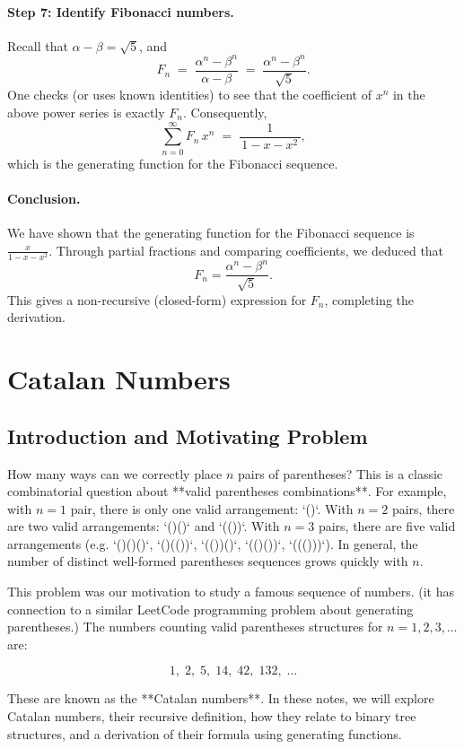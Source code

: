 \documentclass{article}
\begin{document}
\paragraph{Step 7: Identify Fibonacci numbers.}

Recall that \(\alpha - \beta = \sqrt{5}\), and
\[
F_n
\;=\;
\frac{\alpha^n - \beta^n}{\,\alpha - \beta\,}
\;=\;
\frac{\alpha^n - \beta^n}{\,\sqrt{5}\,}.
\]
One checks (or uses known identities) to see that the coefficient of \(x^n\) in the above power series is exactly \(F_n\).  Consequently,
\[
\sum_{n=0}^\infty F_n \, x^n
\;=\;
\frac{1}{\,1 - x - x^2\,},
\]
which is the generating function for the Fibonacci sequence.

\paragraph{Conclusion.}
We have shown that the generating function for the Fibonacci sequence is 
\(\tfrac{x}{1 - x - x^2}\).  
Through partial fractions and comparing coefficients, we deduced that
\[
F_n = \frac{\alpha^n - \beta^n}{\sqrt{5}}.
\]
This gives a non-recursive (closed-form) expression for \(F_n\), completing the derivation.
\section{Catalan Numbers}
\subsection*{Introduction and Motivating Problem}

How many ways can we correctly place $n$ pairs of parentheses? This is a classic combinatorial question about **valid parentheses combinations**. For example, with $n=1$ pair, there is only one valid arrangement: `()`. With $n=2$ pairs, there are two valid arrangements: `()()` and `(())`. With $n=3$ pairs, there are five valid arrangements (e.g. `()()()`, `()(())`, `(())()`, `(()())`, `((()))`). In general, the number of distinct well-formed parentheses sequences grows quickly with $n$. 

This problem was our motivation to study a famous sequence of numbers. (it has connection to a similar LeetCode programming problem about generating parentheses.) The numbers counting valid parentheses structures for $n=1,2,3,\dots$ are:

\[1,\; 2,\; 5,\; 14,\; 42,\; 132,\;\dots\]

These are known as the **Catalan numbers**. In these notes, we will explore Catalan numbers, their recursive definition, how they relate to binary tree structures, and a derivation of their formula using generating functions.
\end{document}
